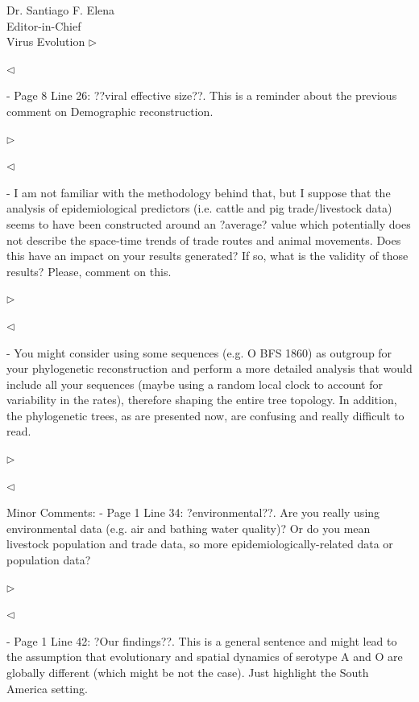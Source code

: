 \documentclass[ucla,biomath,12pt,noaddrfooter,datefrom]{UC_letter}
\newenvironment{reply}{$\triangleright$\bf}{$\triangleleft$}
\begin{document}
\begin{letter}{
Dr. Santiago F. Elena \\
Editor-in-Chief \\
Virus Evolution
}
\begin{reply}

\end{reply}

-       Page 8 Line 26: ??viral effective size??. 
This is a reminder about the previous comment on Demographic reconstruction.

\begin{reply}

\end{reply}

-       I am not familiar with the methodology behind that, but I suppose that the analysis of epidemiological predictors (i.e. cattle and pig trade/livestock data) seems to have been constructed around an ?average? value which potentially does not describe the space-time trends of trade routes and animal movements. 
Does this have an impact on your results generated? 
If so, what is the validity of those results? Please, comment on this.

\begin{reply}

\end{reply}

-       You might consider using some sequences (e.g. O BFS 1860) as outgroup for your phylogenetic reconstruction and perform a more detailed analysis that would include all your sequences (maybe using a random local clock to account for variability in the rates), therefore shaping the entire tree topology. 
In addition, the phylogenetic trees, as are presented now, are confusing and really difficult to read.

\begin{reply}

\end{reply}

Minor Comments:
-       Page 1 Line 34: ?environmental??. 
Are you really using environmental data (e.g. air and bathing water quality)? 
Or do you mean livestock population and trade data, so more epidemiologically-related data or population data?

\begin{reply}

\end{reply}

-       Page 1 Line 42: ?Our findings??. 
This is a general sentence and might lead to the assumption that evolutionary and spatial dynamics of serotype A and O are globally different (which might be not the case). 
Just highlight the South America setting.


\end{letter}
\end{document}
